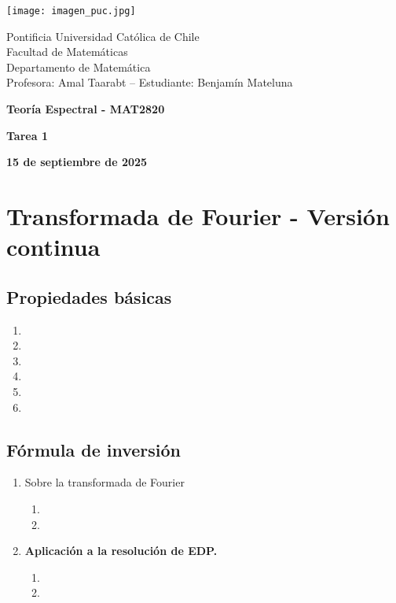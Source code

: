 \documentclass{article}
\begin{document}
\begin{minipage}{2.5cm}
    \texttt{[image: imagen\_puc.jpg]}
\end{minipage}
\begin{minipage}{14cm}
    {\sc Pontificia Universidad Católica de Chile\\
    Facultad de Matemáticas\\
    Departamento de Matemática\\
    Profesora: Amal Taarabt -- Estudiante: Benjamín Mateluna}
\end{minipage}
\vspace{1ex}

{\centerline{\bf Teoría Espectral - MAT2820}
\centerline{\bf Tarea 1}}
\centerline{\bf 15 de septiembre de 2025}

\section{Transformada de Fourier - Versión continua}
\subsection{Propiedades básicas}
\begin{enumerate}
    \item 
    \item 
    \item 
    \item 
    \item 
    \item 
\end{enumerate}

\subsection{Fórmula de inversión}
\begin{enumerate}
    \item Sobre la transformada de Fourier
    \begin{enumerate}
        \item 
        \item 
    \end{enumerate}
    \item\textbf{Aplicación a la resolución de EDP.}
    \begin{enumerate}
        \item 
        \item 
    \end{enumerate}
\end{enumerate}
\end{document}
